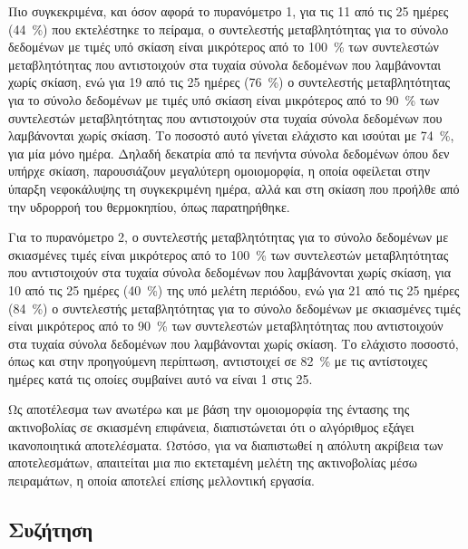 \documentclass[12pt, a4paper]{report} %
\begin{document}
Πιο συγκεκριμένα, και όσον αφορά το πυρανόμετρο 1, για τις 11 από τις 25 ημέρες (\SI{44}{\percent}) που εκτελέστηκε 
το πείραμα, ο συντελεστής μεταβλητότητας για το σύνολο δεδομένων με τιμές υπό σκίαση είναι μικρότερος από το 
\SI{100}{\percent} των συντελεστών μεταβλητότητας που αντιστοιχούν στα τυχαία σύνολα δεδομένων που λαμβάνονται χωρίς 
σκίαση, ενώ για 19 από τις 25 ημέρες (\SI{76}{\percent}) ο συντελεστής μεταβλητότητας για το σύνολο δεδομένων με τιμές 
υπό σκίαση είναι μικρότερος από το \SI{90}{\percent} των συντελεστών μεταβλητότητας που αντιστοιχούν στα τυχαία σύνολα 
δεδομένων που λαμβάνονται χωρίς σκίαση. Το ποσοστό αυτό γίνεται ελάχιστο και ισούται με \SI{74}{\percent}, για μία μόνο 
ημέρα. Δηλαδή δεκατρία από τα πενήντα σύνολα δεδομένων όπου δεν υπήρχε σκίαση, παρουσιάζουν μεγαλύτερη ομοιομορφία, 
η οποία οφείλεται στην ύπαρξη νεφοκάλυψης τη συγκεκριμένη ημέρα, αλλά και στη σκίαση που προήλθε από την υδρορροή του 
θερμοκηπίου, όπως παρατηρήθηκε.

Για το πυρανόμετρο 2, ο συντελεστής μεταβλητότητας για το σύνολο δεδομένων με σκιασμένες τιμές είναι μικρότερος από το 
\SI{100}{\percent} των συντελεστών μεταβλητότητας που αντιστοιχούν στα τυχαία σύνολα δεδομένων που λαμβάνονται χωρίς 
σκίαση, για 10 από τις 25 ημέρες (\SI{40}{\percent}) της υπό μελέτη περιόδου, ενώ για 21 από τις 25 ημέρες 
(\SI{84}{\percent}) ο συντελεστής μεταβλητότητας για το σύνολο δεδομένων με σκιασμένες τιμές είναι μικρότερος από το 
\SI{90}{\percent} των συντελεστών μεταβλητότητας που αντιστοιχούν στα τυχαία σύνολα δεδομένων που λαμβάνονται χωρίς 
σκίαση. Το ελάχιστο ποσοστό, όπως και στην προηγούμενη περίπτωση, αντιστοιχεί σε \SI{82}{\percent} με τις αντίστοιχες 
ημέρες κατά τις οποίες συμβαίνει αυτό να είναι 1 στις 25.

Ως αποτέλεσμα των ανωτέρω και με βάση την ομοιομορφία της έντασης της ακτινοβολίας σε σκιασμένη επιφάνεια, διαπιστώνεται 
ότι ο αλγόριθμος εξάγει ικανοποιητικά αποτελέσματα. Ωστόσο, για να διαπιστωθεί η απόλυτη ακρίβεια των αποτελεσμάτων, 
απαιτείται μια πιο εκτεταμένη μελέτη της ακτινοβολίας μέσω πειραμάτων, η οποία αποτελεί επίσης μελλοντική εργασία.

\subsection{Συζήτηση}\label{sub_alg_disc}
\end{document}
